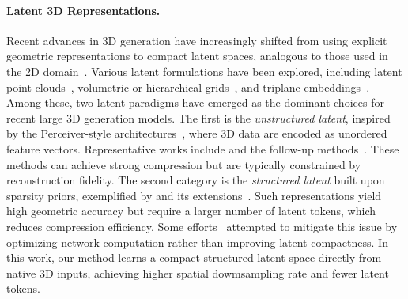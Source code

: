 \documentclass[10pt,twocolumn,letterpaper]{article}
\newcommand{\paravspace}{\vspace{-11pt}}
\begin{document}
\paragraph{Latent 3D Representations.}
Recent advances in 3D generation have increasingly shifted from using explicit geometric representations to compact latent spaces, analogous to those used in the 2D domain~\cite{rombach2022high}.
Various latent formulations have been explored, including latent point clouds~\cite{lan2024ga,yang2024atlas,chen20243dtopia,vahdat2022lion}, volumetric or hierarchical grids~\cite{ntavelis2023autodecoding,xiong2025octfusion,ren2024xcube,meng2025lt3sd}, and triplane embeddings~\cite{wu2024direct3d,lan2024ln3diff,gupta20233dgen}.
Among these, two latent paradigms have emerged as the dominant choices for recent large 3D generation models.
The first is the \emph{unstructured latent}, inspired by the Perceiver-style architectures~\cite{jaegle2021perceiver}, where 3D data are encoded as unordered  feature vectors.
Representative works include \cite{zhang20233dshape2vecset,zhao2024michelangelo} and the follow-up methods~\cite{jun2023shap,zhang2024clay,li2024craftsman,li2025step1x,hunyuan3d2025hunyuan3d}.
These methods can achieve strong compression but are typically constrained by reconstruction fidelity.
The second category is the \emph{structured latent} built upon sparsity priors, exemplified by \cite{xiang2025structured} and its extensions~\cite{li2025sparc3d,he2025sparseflex}.
Such representations yield high geometric accuracy but require a larger number of latent tokens, which reduces compression efficiency.
Some efforts~\cite{wu2025direct3d,chen2025ultra3d} attempted to mitigate this issue by optimizing network computation rather than improving latent compactness.
In this work, our method learns a compact structured latent space directly from native 3D inputs, achieving higher spatial dowmsampling rate and fewer latent tokens.

\paravspace
\end{document}
